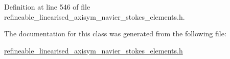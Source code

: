Definition at line 546 of file refineable\+\_\+linearised\+\_\+axisym\+\_\+navier\+\_\+stokes\+\_\+elements.\+h.



The documentation for this class was generated from the following file\+:\begin{DoxyCompactItemize}
\item 
\hyperlink{refineable__linearised__axisym__navier__stokes__elements_8h}{refineable\+\_\+linearised\+\_\+axisym\+\_\+navier\+\_\+stokes\+\_\+elements.\+h}\end{DoxyCompactItemize}

